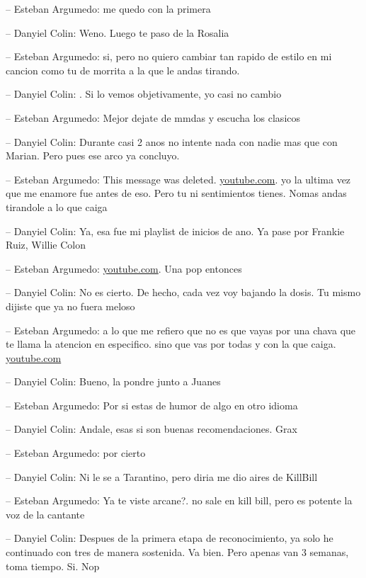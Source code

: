 -- Esteban Argumedo: me quedo con la primera

-- Danyiel Colin: Weno. Luego te paso de la Rosalia

-- Esteban Argumedo: si, pero no quiero cambiar tan rapido de estilo en
mi cancion como tu de morrita a la que le andas tirando.

-- Danyiel Colin: . Si lo vemos objetivamente, yo casi no cambio

-- Esteban Argumedo: Mejor dejate de mmdas y escucha los clasicos

-- Danyiel Colin: Durante casi 2 anos no intente nada con nadie mas que
con Marian. Pero pues ese arco ya concluyo.

-- Esteban Argumedo: This message was deleted.
\href{https://www.youtube.com/watch?v=0nBFWzpWXuM\&list=PLqrrTT1Y5oWFNGfuBF18rdVwOFQTXObKt\&index=173}{youtube.com}.
yo la ultima vez que me enamore fue antes de eso. Pero tu ni
sentimientos tienes. Nomas andas tirandole a lo que caiga

-- Danyiel Colin: Ya, esa fue mi playlist de inicios de ano. Ya pase por
Frankie Ruiz, Willie Colon

-- Esteban Argumedo:
\href{https://www.youtube.com/watch?v=NUsoVlDFqZg\&list=PLqrrTT1Y5oWFNGfuBF18rdVwOFQTXObKt\&index=175}{youtube.com}.
Una pop entonces

-- Danyiel Colin: No es cierto. De hecho, cada vez voy bajando la dosis.
Tu mismo dijiste que ya no fuera meloso

-- Esteban Argumedo: a lo que me refiero que no es que vayas por una
chava que te llama la atencion en especifico. sino que vas por todas y
con la que caiga.
\href{https://www.youtube.com/watch?v=ifs4zmWD3ms\&list=PLqrrTT1Y5oWFNGfuBF18rdVwOFQTXObKt\&index=168}{youtube.com}

-- Danyiel Colin: Bueno, la pondre junto a Juanes

-- Esteban Argumedo: Por si estas de humor de algo en otro idioma

-- Danyiel Colin: Andale, esas si son buenas recomendaciones. Grax

-- Esteban Argumedo: por cierto

-- Danyiel Colin: Ni le se a Tarantino, pero diria me dio aires de
KillBill

-- Esteban Argumedo: Ya te viste arcane?. no sale en kill bill, pero es
potente la voz de la cantante

-- Danyiel Colin: Despues de la primera etapa de reconocimiento, ya solo
he continuado con tres de manera sostenida. Va bien. Pero apenas van 3
semanas, toma tiempo. Si. Nop

